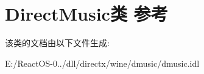 \hypertarget{class_direct_music}{}\section{Direct\+Music类 参考}
\label{class_direct_music}


该类的文档由以下文件生成\+:\begin{DoxyCompactItemize}
\item 
E\+:/\+React\+O\+S-\/0../dll/directx/wine/dmusic/dmusic.\+idl\end{DoxyCompactItemize}

